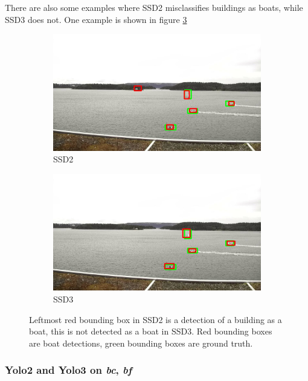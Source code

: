 There are also some examples where SSD2 misclassifies buildings as boats, while SSD3 does not. One example is shown in figure \ref{img:misclass_ssd}

\begin{figure}[h!]
\begin{subfigure}{.5\textwidth}
  \centering
  \includegraphics[width=0.9\linewidth]{results/case_buildings/misclass/selected_08_07_frame11982_bbnb.jpg}
  \caption{SSD2}
  \label{fig:misclass_ssd2}
\end{subfigure}%
\begin{subfigure}{.5\textwidth}
  \centering
  \includegraphics[width=.9\linewidth]{results/case_buildings/misclass/selected_08_07_frame11982_build.jpg}
  \caption{SSD3}
  \label{fig:misclass_ssd3}
\end{subfigure}
\caption{Leftmost red bounding box in SSD2 is a detection of a building as a boat, this is not detected as a boat in SSD3. Red bounding boxes are boat detections, green bounding boxes are ground truth.}
\label{img:misclass_ssd}
\end{figure}

\vspace{3mm}
\newpage

\subsubsection{Yolo2 and Yolo3 on \textit{bc}, \textit{bf}}

